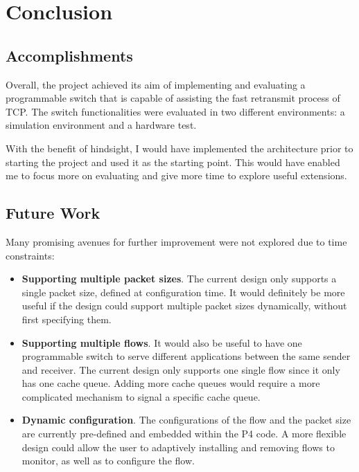 \chapter{Conclusion}
\section{Accomplishments}
Overall, the project achieved its aim of implementing and evaluating a programmable switch that is capable of assisting the fast retransmit process of TCP. The switch functionalities were evaluated in two different environments: a simulation environment and a hardware test. 

With the benefit of hindsight, I would have implemented the architecture prior to starting the project and used it as the starting point. This would have enabled me to focus more on evaluating and give more time to explore useful extensions.

\section{Future Work}

Many promising avenues for further improvement were not explored due to time constraints:

\begin{itemize}
	\item \textbf{Supporting multiple packet sizes}. The current design only supports a single packet size, defined at configuration time. It would definitely be more useful if the design could support multiple packet sizes dynamically, without first specifying them.
	
	\item \textbf{Supporting multiple flows}. It would also be useful to have one programmable switch to serve different applications between the same sender and receiver. The current design only supports one single flow since it only has one cache queue. Adding more cache queues would require a more complicated mechanism to signal a specific cache queue. 
	
	\item \textbf{Dynamic configuration}. The configurations of the flow and the packet size are currently pre-defined and embedded within the P4 code. A more flexible design could allow the user to adaptively installing and removing flows to monitor, as well as to configure the flow. 
	
\end{itemize}

